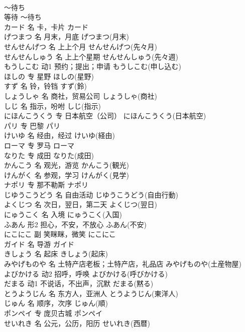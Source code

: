 \documentclass[8pt]{extreport}
\begin{document}
\begin{CJK}{UTF8}{min}
\\	～待ち	
\\	等待	～待ち	
\\	カード	名	卡，卡片	カード	
\\	げつまつ	名	月末，月底	げつまつ(月末)	
\\	せんせんげつ	名	上上个月	せんせんげつ(先々月)	
\\	せんせんしゅう	名	上上个星期	せんせんしゅう(先々週)	
\\	もうしこむ	动1	预约；提出；申请	もうしこむ(申し込む)	
\\	ほしの	专	星野	ほしの(星野)	
\\	すず	名	铃，铃铛	すず(鈴)	
\\	しょうしゃ	名	商社，贸易公司	しょうしゃ(商社)	
\\	しじ	名	指示，吩咐	しじ(指示)	
\\	にほんこうくう	专	日本航空（公司）	にほんこうくう(日本航空)	
\\	パリ	专	巴黎	パリ	
\\	けいゆ	名	经由，经过	けいゆ(経由)	
\\	ローマ	专	罗马	ローマ	
\\	なりた	专	成田	なりた(成田)	
\\	かんこう	名	观光，游览	かんこう(観光)	
\\	けんがく	名	参观，学习	けんがく(見学)	
\\	ナポリ	专	那不勒斯	ナポリ	
\\	じゆうこうどう	名	自由活动	じゆうこうどう(自由行動)	
\\	よくじつ	名	次日，翌日，第二天	よくじつ(翌日)	
\\	にゅうこく	名	入境	にゅうこく(入国)	
\\	ふあん	形2	担心，不安，不放心	ふあん(不安)	
\\	にこにこ	副	笑眯眯，微笑	にこにこ	
\\	ガイド	名	导游	ガイド	
\\	きしょう	名	起床	きしょう(起床)	
\\	みやげものや	名	土特产店老板；土特产店，礼品店	みやげものや(土産物屋)	
\\	よびかける	动2	招呼，呼唤	よびかける(呼びかける)	
\\	だまる	动1	不说话，不出声，沉默	だまる(黙る)	
\\	とうようじん	名	东方人，亚洲人	とうようじん(東洋人)	
\\	じゅん	名	顺序，次序	じゅん(順)	
\\	ポンペイ	专	庞贝古城	ポンペイ	
\\	せいれき	名	公元，公历，阳历	せいれき(西暦)	

\end{CJK}
\end{document}
